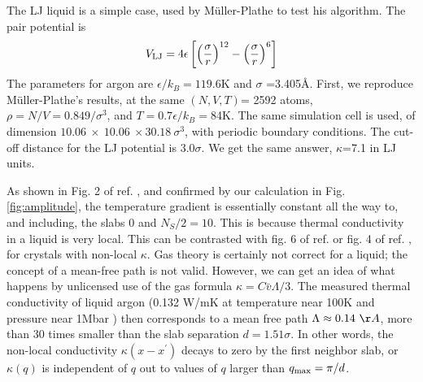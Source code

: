 \documentclass[aps,prb,twocolumn,showpacs,superscriptaddress]{revtex4-1}\begin{tiny}\end{tiny}
\begin{document}
The LJ liquid is a simple case, used by M\"uller-Plathe \cite{FMP} to test his algorithm.
The pair potential is
%
\begin{equation}
V_{\rm LJ}=4\epsilon \left[ \left (\frac{\sigma}{r}\right)^{12} - \left (\frac{\sigma}{r}\right)^6 \right]
\label{eq:VLJ}
\end{equation}
%
The parameters for argon are $\epsilon/k_B=119.6$K
and $\sigma$ =3.405\AA.
First, we reproduce M\"uller-Plathe's results, at the same $(N,V,T)$=
2592 atoms, $\rho=N/V=0.849/\sigma^3$, and $T=0.7\epsilon/k_B=$84K. The same simulation
cell is used, of dimension $10.06 \ \times \ 10.06 \ \times 30.18 \ \sigma^3$, with
periodic boundary conditions.
The cut-off distance for the LJ potential is $3.0\sigma$.  We get the same 
answer, $\kappa$=7.1 in LJ units.

As shown in Fig. 2 of ref. ,
and confirmed by our calculation in Fig. \ref{fig:amplitude}, 
the temperature gradient is essentially constant all the way to, and including, 
the slabs $0$ and $N_S/2=10$.  This is because thermal conductivity in a liquid is
very local.  This can be contrasted with fig. 6 of ref.  or fig. 4
of ref. , for crystals with non-local $\kappa$.
Gas theory is certainly not correct for a liquid; the concept of a mean-free
path is not valid.  However, we can get an idea of what happens by unlicensed use of the gas 
formula $\kappa = C{\bar v}\Lambda/3$.  The measured thermal conductivity
of liquid argon (0.132 W/mK at temperature near 100K and pressure 
near 1Mbar \cite{Younglove,argonk})
then corresponds to a mean free path $\Lambda \approx 0.14 \ \AA$, more
than 30 times smaller than the slab separation $d=1.51\sigma$.  In other words, the non-local
conductivity $\kappa(x-x^\prime)$ decays to zero by the first neighbor slab, or
$\kappa(q)$ is independent of $q$ out to values of $q$ larger than $q_{\rm max}=\pi/d$. 
\end{document}
